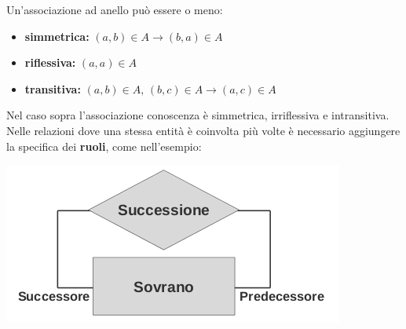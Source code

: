 \documentclass[a4paper,12pt, oneside]{book}
\begin{document}
Un'associazione ad anello può essere o meno:
\begin{itemize}
\item \textbf{simmetrica:} $(a,b)\in A\to (b,a)\in A$
\item \textbf{riflessiva:} $(a,a)\in A$
\item \textbf{transitiva:} $(a,b)\in A,\,(b,c)\in A \to (a,c)\in A$
\end{itemize}
Nel caso sopra l'associazione conoscenza è simmetrica,
irriflessiva e intransitiva.\\
Nelle relazioni dove una stessa entità è coinvolta più volte è necessario aggiungere la specifica dei \textbf{ruoli}, come nell'esempio:
\begin{center}
\includegraphics[scale=2.5]{img/bas8.png}
\end{center}
\end{document}
